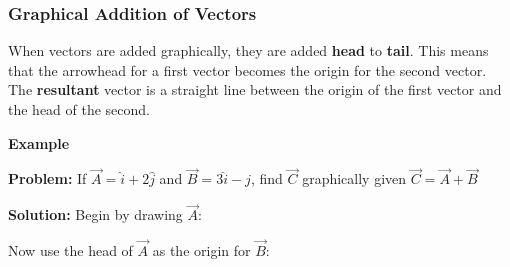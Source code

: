 	\subsubsection{Graphical Addition of Vectors} 
	When vectors are added graphically, they are added \textbf{head} to \textbf{tail}.  This means that the arrowhead for a first vector becomes the origin for the second vector.  The \textbf{resultant} vector is a straight line between the origin of the first vector and the head of the second.  
	
	
	\begin{mdframed}[backgroundcolor=blue!10!white]
		\begin{center}
			
			
			\textbf{Example \thesubsection}	\label{test}
		\end{center}
		
		\vspace{0.1in}
		\textbf{Problem:}  If $\vec{A} =  \hat{i} + 2 \hat{j} $ and $\vec{B} = 3 \hat{i} - \hat{j} $, 
		find $\vec{C}$ graphically given $\vec{C} = \vec{A} + \vec{B}$ 
		
		\vspace{0.1in}
		
		
		\textbf{Solution:} Begin by drawing $\vec{A}$:
		
		
			
		
		\begin{center}
			
		\end{center}
	
		Now use the head of $\vec{A} $ as the origin for $\vec{B}$:
	
	
		\begin{center}
		
		
		
		
		
		
\end{center}
\end{mdframed}
